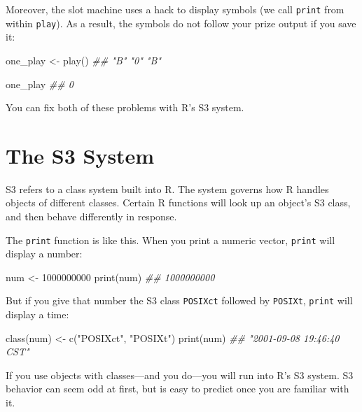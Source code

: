 \documentclass[
  letterpaper,
  DIV=11,
  numbers=noendperiod]{scrbook}
\newenvironment{Shaded}{\begin{snugshade}}{\end{snugshade}}
\newcommand{\DecValTok}[1]{\textcolor[rgb]{0.68,0.00,0.00}{#1}}
\newcommand{\DocumentationTok}[1]{\textcolor[rgb]{0.37,0.37,0.37}{\textit{#1}}}
\newcommand{\FunctionTok}[1]{\textcolor[rgb]{0.28,0.35,0.67}{#1}}
\newcommand{\NormalTok}[1]{\textcolor[rgb]{0.00,0.23,0.31}{#1}}
\newcommand{\OtherTok}[1]{\textcolor[rgb]{0.00,0.23,0.31}{#1}}
\newcommand{\StringTok}[1]{\textcolor[rgb]{0.13,0.47,0.30}{#1}}
\begin{document}
Moreover, the slot machine uses a hack to display symbols (we call
\texttt{print} from within \texttt{play}). As a result, the symbols do
not follow your prize output if you save it:

\begin{Shaded}
\begin{Highlighting}[]
\NormalTok{one\_play }\OtherTok{\textless{}{-}} \FunctionTok{play}\NormalTok{()}
\DocumentationTok{\#\# "B" "0" "B" }

\NormalTok{one\_play}
\DocumentationTok{\#\# 0}
\end{Highlighting}
\end{Shaded}

You can fix both of these problems with R's S3 system.

\section{The S3 System}\label{the-s3-system}

S3 refers to a class system built into R. The system governs how R
handles objects of different classes. Certain R functions will look up
an object's S3 class, and then behave differently in response.

The \texttt{print} function is like this. When you print a numeric
vector, \texttt{print} will display a number:

\begin{Shaded}
\begin{Highlighting}[]
\NormalTok{num }\OtherTok{\textless{}{-}} \DecValTok{1000000000}
\FunctionTok{print}\NormalTok{(num)}
\DocumentationTok{\#\# 1000000000}
\end{Highlighting}
\end{Shaded}

But if you give that number the S3 class \texttt{POSIXct} followed by
\texttt{POSIXt}, \texttt{print} will display a time:

\begin{Shaded}
\begin{Highlighting}[]
\FunctionTok{class}\NormalTok{(num) }\OtherTok{\textless{}{-}} \FunctionTok{c}\NormalTok{(}\StringTok{"POSIXct"}\NormalTok{, }\StringTok{"POSIXt"}\NormalTok{)}
\FunctionTok{print}\NormalTok{(num)}
\DocumentationTok{\#\# "2001{-}09{-}08 19:46:40 CST"}
\end{Highlighting}
\end{Shaded}

If you use objects with classes---and you do---you will run into R's S3
system. S3 behavior can seem odd at first, but is easy to predict once
you are familiar with it.
\end{document}
